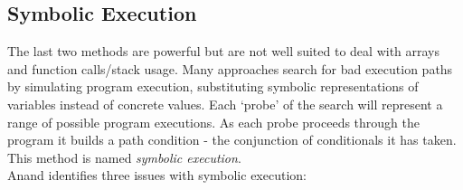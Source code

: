 \documentclass[12pt,a4paper]{article}
\begin{document}
\subsection{Symbolic Execution}
The last two methods are powerful but are not well suited to deal with arrays and function calls/stack usage. Many approaches search for bad execution paths by
simulating program execution, substituting symbolic representations of variables instead of concrete values. Each `probe' of the search will represent a range of possible program executions. As each
probe proceeds through the program it builds a path condition - the conjunction of conditionals it has taken. This method is named \emph{symbolic execution}.\\

\noindent
Anand\cite[pp.~2--3]{anand} identifies three issues with symbolic execution:\\
\end{document}
